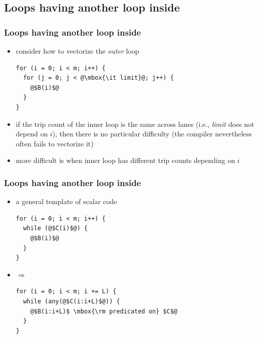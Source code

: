\documentclass[12pt,dvipdfmx]{beamer}
\begin{document}
\subsection{Loops having another loop inside}

\begin{frame}[fragile]
  \frametitle{Loops having another loop inside}
  \begin{itemize}
  \item consider how to vectorize the {\it outer} loop
\begin{lstlisting}
for (i = 0; i < m; i++) {
  for (j = 0; j < @\mbox{\it limit}@; j++) {
    @$B(i)$@
  }
}    
\end{lstlisting}
  \item if the trip count of the inner loop is
    the same across lanes (i.e., {\it limit} does not depend on $i$),
    then there is no particular difficulty (the compiler nevertheless
    often fails to vectorize it)

  \item more difficult is when inner loop has different trip counts
    depending on $i$
  \end{itemize}
\end{frame}

\begin{frame}[fragile]
  \frametitle{Loops having another loop inside}
  \begin{itemize}
  \item a general template of scalar code
\begin{lstlisting}
for (i = 0; i < m; i++) {
  while (@$C(i)$@) {
    @$B(i)$@
  }
}    
\end{lstlisting}
\item $\Rightarrow$
\begin{lstlisting}
for (i = 0; i < m; i += L) {
  while (any(@$C(i:i+L)$@)) {
    @$B(i:i+L)$ \mbox{\rm predicated on} $C$@
  }
}    
\end{lstlisting}
  
  \end{itemize}
\end{frame}
\end{document}
